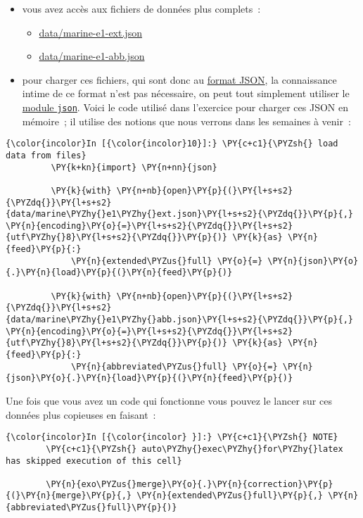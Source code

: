 \begin{itemize}
\tightlist
\item
  vous avez accès aux fichiers de données plus complets~:

  \begin{itemize}
  \tightlist
  \item
    \url{data/marine-e1-ext.json}
  \item
    \url{data/marine-e1-abb.json}
  \end{itemize}
\item
  pour charger ces fichiers, qui sont donc au
  \href{http://en.wikipedia.org/wiki/JSON}{format JSON}, la connaissance
  intime de ce format n'est pas nécessaire, on peut tout simplement
  utiliser le \href{https://docs.python.org/3/library/json.html}{module
  \texttt{json}}. Voici le code utilisé dans l'exercice pour charger ces
  JSON en mémoire~; il utilise des notions que nous verrons dans les
  semaines à venir~:
\end{itemize}

    \begin{Verbatim}[commandchars=\\\{\}]
{\color{incolor}In [{\color{incolor}10}]:} \PY{c+c1}{\PYZsh{} load data from files}
         \PY{k+kn}{import} \PY{n+nn}{json}
         
         \PY{k}{with} \PY{n+nb}{open}\PY{p}{(}\PY{l+s+s2}{\PYZdq{}}\PY{l+s+s2}{data/marine\PYZhy{}e1\PYZhy{}ext.json}\PY{l+s+s2}{\PYZdq{}}\PY{p}{,} \PY{n}{encoding}\PY{o}{=}\PY{l+s+s2}{\PYZdq{}}\PY{l+s+s2}{utf\PYZhy{}8}\PY{l+s+s2}{\PYZdq{}}\PY{p}{)} \PY{k}{as} \PY{n}{feed}\PY{p}{:}
             \PY{n}{extended\PYZus{}full} \PY{o}{=} \PY{n}{json}\PY{o}{.}\PY{n}{load}\PY{p}{(}\PY{n}{feed}\PY{p}{)}
         
         \PY{k}{with} \PY{n+nb}{open}\PY{p}{(}\PY{l+s+s2}{\PYZdq{}}\PY{l+s+s2}{data/marine\PYZhy{}e1\PYZhy{}abb.json}\PY{l+s+s2}{\PYZdq{}}\PY{p}{,} \PY{n}{encoding}\PY{o}{=}\PY{l+s+s2}{\PYZdq{}}\PY{l+s+s2}{utf\PYZhy{}8}\PY{l+s+s2}{\PYZdq{}}\PY{p}{)} \PY{k}{as} \PY{n}{feed}\PY{p}{:}
             \PY{n}{abbreviated\PYZus{}full} \PY{o}{=} \PY{n}{json}\PY{o}{.}\PY{n}{load}\PY{p}{(}\PY{n}{feed}\PY{p}{)}
\end{Verbatim}


    Une fois que vous avez un code qui fonctionne vous pouvez le lancer sur
ces données plus copieuses en faisant~:

    \begin{Verbatim}[commandchars=\\\{\}]
{\color{incolor}In [{\color{incolor} }]:} \PY{c+c1}{\PYZsh{} NOTE}
        \PY{c+c1}{\PYZsh{} auto\PYZhy{}exec\PYZhy{}for\PYZhy{}latex has skipped execution of this cell}
        
        \PY{n}{exo\PYZus{}merge}\PY{o}{.}\PY{n}{correction}\PY{p}{(}\PY{n}{merge}\PY{p}{,} \PY{n}{extended\PYZus{}full}\PY{p}{,} \PY{n}{abbreviated\PYZus{}full}\PY{p}{)}
\end{Verbatim}



    
    
    

